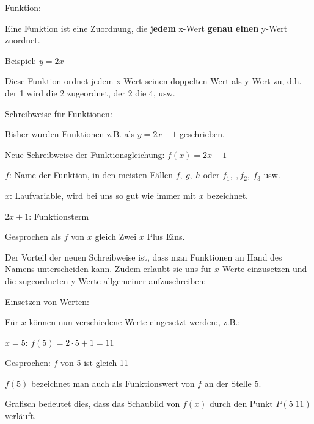 \begin{tcolorbox}
	Funktion:
	
	\bigskip
	
	\textcolor{loestc}{Eine Funktion ist eine Zuordnung, die \textbf{jedem} x-Wert \textbf{genau einen} y-Wert zuordnet.
	}
\end{tcolorbox}
Beispiel: \(y=2x\)

\textcolor{loes}{Diese Funktion ordnet jedem x-Wert seinen doppelten Wert als y-Wert zu, d.h. der 1 wird die 2 zugeordnet, der 2 die 4, usw.}

\bigskip

\begin{tcolorbox}
	Schreibweise für Funktionen:
	
	\bigskip
	
	\textcolor{loestc}{Bisher wurden Funktionen z.B. als \(y=2x+1\) geschrieben.}
	
	\bigskip
	
	\textcolor{loestc}{Neue Schreibweise der Funktionsgleichung: \(f(x)=2x+1\)}
	
	\bigskip
	
	\textcolor{loestc}{\(f\): Name der Funktion, in den meisten Fällen \(f,\ g,\ h\) oder \(f_1,\ ,f_2,\ f_3\) usw.}
	
	\bigskip
	
	\textcolor{loestc}{\(x\): Laufvariable, wird bei uns so gut wie immer mit \(x\) bezeichnet.}
	
	\bigskip
	
	\textcolor{loestc}{\(2x+1\): Funktionsterm}
	
	\bigskip
	
	\textcolor{loestc}{Gesprochen als \(f\) von \(x\) gleich Zwei \(x\) Plus Eins.}
\end{tcolorbox}
Der Vorteil der neuen Schreibweise ist, dass man Funktionen an Hand des Namens unterscheiden kann. Zudem erlaubt sie uns für \(x\) Werte einzusetzen und die zugeordneten y-Werte allgemeiner aufzuschreiben:
\begin{tcolorbox}
	Einsetzen von Werten:
	
	\bigskip
		
	\textcolor{loestc}{Für \(x\) können nun verschiedene Werte eingesetzt werden:, z.B.:}
	
	\bigskip
	
	\textcolor{loestc}{\(x=5\): \(f(5)=2\cdot 5+1=11\)}
	
	\bigskip
	
	\textcolor{loestc}{Gesprochen: \(f\) von 5 ist gleich 11}
	
	\bigskip
	
	\textcolor{loestc}{\(f(5)\) bezeichnet man auch als Funktionswert von \(f\) an der Stelle 5.}
	
	\textcolor{loestc}{Grafisch bedeutet dies, dass das Schaubild von \(f(x)\) durch den Punkt \(P(5|11)\) verläuft.}
\end{tcolorbox}
